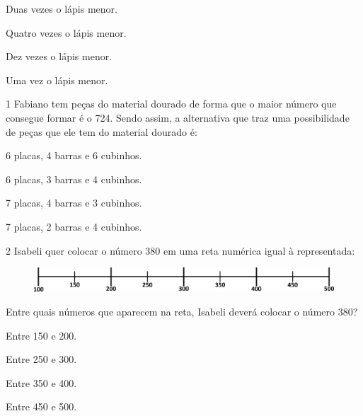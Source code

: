 \begin{escolha}
\item
  Duas vezes o lápis menor.
\item
  Quatro vezes o lápis menor.
\item
  Dez vezes o lápis menor.
\item
  Uma vez o lápis menor.
\end{escolha}
\pagebreak

\vspace*{-3.4cm}

\pagebreak
\num{1} Fabiano tem peças do material dourado de forma que o maior número
que consegue formar é o 724. Sendo assim, a alternativa que traz uma
possibilidade de peças que ele tem do material dourado é:

\begin{escolha}
\item
  6 placas, 4 barras e 6 cubinhos.
\item
  6 placas, 3 barras e 4 cubinhos.
\item
  7 placas, 4 barras e 3 cubinhos.
\item
  7 placas, 2 barras e 4 cubinhos.
\end{escolha}

\num{2} Isabeli quer colocar o número 380 em uma reta numérica igual à representada:

\begin{figure}[htpb!]
\centering
\includegraphics[width=\textwidth]{./media/image102.png}
\end{figure}

Entre quais números que aparecem na reta, Isabeli deverá colocar o número 380?

\begin{multicols}{2}
\begin{escolha}
\item
  Entre 150 e 200.
\item
  Entre 250 e 300.
\item
  Entre 350 e 400.
\item
  Entre 450 e 500.
\end{escolha}
\end{multicols}


